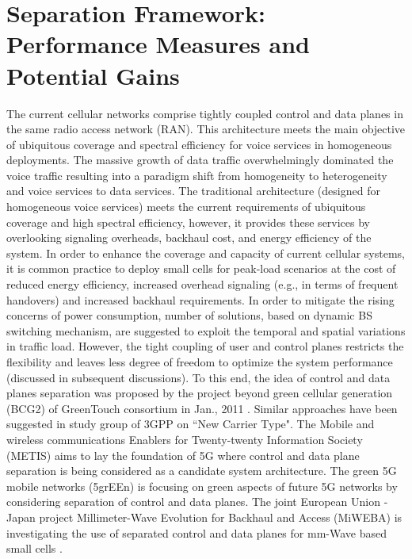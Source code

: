 \documentclass[article,10pt,twocolumn]{IEEEtran}
\begin{document}
\section{Separation Framework: Performance Measures and Potential Gains}\label{sec:EE}
The current cellular networks comprise tightly coupled control and data planes in the same radio access network (RAN). This architecture meets the main objective of ubiquitous coverage and spectral efficiency for voice services in homogeneous deployments. The massive growth of data traffic overwhelmingly dominated the voice traffic resulting into a paradigm shift from homogeneity to heterogeneity and voice services to data services. The traditional architecture (designed for homogeneous voice services) meets the current requirements of ubiquitous coverage and high spectral efficiency, however, it provides these services by overlooking signaling overheads, backhaul cost, and energy efficiency of the system. In order to enhance the coverage and capacity of current cellular systems, it is common practice to deploy small cells for peak-load scenarios at the cost of reduced energy efficiency, increased overhead signaling (e.g., in terms of frequent handovers) and increased backhaul requirements. In order to mitigate the rising concerns of power consumption, number of solutions, based on dynamic BS switching mechanism, are suggested to exploit the temporal and spatial variations in traffic load. However, the tight coupling of user and control planes restricts the flexibility and leaves less degree of freedom to optimize the system performance (discussed in subsequent discussions). To this end, the idea of control and data planes separation was proposed by the project beyond green cellular generation (BCG2) of GreenTouch consortium in Jan., 2011 \citep{greentouch}. Similar approaches have been suggested in study group of 3GPP on ``New Carrier Type". The Mobile and wireless communications Enablers for Twenty-twenty Information Society (METIS) \citep{METIS} aims to lay the foundation of 5G where control and data plane separation is being considered as a candidate system architecture. The green 5G mobile networks (5grEEn)  is focusing on green aspects of future 5G networks by considering separation of control and data planes. The joint European Union - Japan project Millimeter-Wave Evolution for Backhaul and Access (MiWEBA) is investigating the use of separated control and data planes for mm-Wave based small cells \citep{MiWEBA}.
\end{document}
